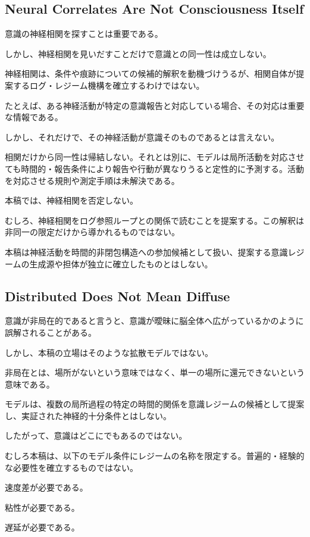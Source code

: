 \subsection{Neural Correlates Are Not Consciousness Itself}

意識の神経相関を探すことは重要である。

しかし、神経相関を見いだすことだけで意識との同一性は成立しない。

神経相関は、条件や痕跡についての候補的解釈を動機づけうるが、相関自体が提案するログ・レジーム機構を確立するわけではない。

たとえば、ある神経活動が特定の意識報告と対応している場合、その対応は重要な情報である。

しかし、それだけで、その神経活動が意識そのものであるとは言えない。

相関だけから同一性は帰結しない。それとは別に、モデルは局所活動を対応させても時間的・報告条件により報告や行動が異なりうると定性的に予測する。活動を対応させる規則や測定手順は未解決である。

本稿では、神経相関を否定しない。

むしろ、神経相関をログ参照ループとの関係で読むことを提案する。この解釈は非同一の限定だけから導かれるものではない。

本稿は神経活動を時間的非閉包構造への参加候補として扱い、提案する意識レジームの生成源や担体が独立に確立したものとはしない。

\subsection{Distributed Does Not Mean Diffuse}

意識が非局在的であると言うと、意識が曖昧に脳全体へ広がっているかのように誤解されることがある。

しかし、本稿の立場はそのような拡散モデルではない。

非局在とは、場所がないという意味ではなく、単一の場所に還元できないという意味である。

モデルは、複数の局所過程の特定の時間的関係を意識レジームの候補として提案し、実証された神経的十分条件とはしない。

したがって、意識はどこにでもあるのではない。

むしろ本稿は、以下のモデル条件にレジームの名称を限定する。普遍的・経験的な必要性を確立するものではない。

速度差が必要である。

粘性が必要である。

遅延が必要である。

